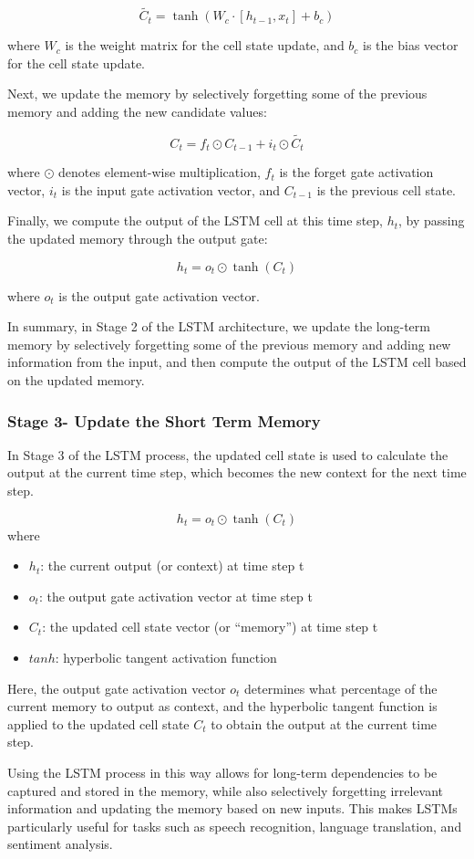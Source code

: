 \documentclass[
]{article}
\providecommand{\tightlist}{%
  \setlength{\itemsep}{0pt}\setlength{\parskip}{0pt}}
\begin{document}
\[\tilde{C_t} = \tanh(W_c \cdot [h_{t-1}, x_t] + b_c)\]

where \(W_c\) is the weight matrix for the cell state update, and
\(b_c\) is the bias vector for the cell state update.

Next, we update the memory by selectively forgetting some of the
previous memory and adding the new candidate values:

\[C_t = f_t \odot C_{t-1} + i_t \odot \tilde{C_t}\]

where \(\odot\) denotes element-wise multiplication, \(f_t\) is the
forget gate activation vector, \(i_t\) is the input gate activation
vector, and \(C_{t-1}\) is the previous cell state.

Finally, we compute the output of the LSTM cell at this time step,
\(h_t\), by passing the updated memory through the output gate:

\[h_t = o_t \odot \tanh(C_t)\]

where \(o_t\) is the output gate activation vector.

In summary, in Stage 2 of the LSTM architecture, we update the long-term
memory by selectively forgetting some of the previous memory and adding
new information from the input, and then compute the output of the LSTM
cell based on the updated memory.

\hypertarget{stage-3--update-the-short-term-memory}{%
\subsubsection{Stage 3- Update the Short Term
Memory}\label{stage-3--update-the-short-term-memory}}

In Stage 3 of the LSTM process, the updated cell state is used to
calculate the output at the current time step, which becomes the new
context for the next time step.

\[ h_t = o_t \odot \tanh(C_t) \] where

\begin{itemize}
\tightlist
\item
  \(h_t\): the current output (or context) at time step t
\item
  \(o_t\): the output gate activation vector at time step t
\item
  \(C_t\): the updated cell state vector (or ``memory'') at time step t
\item
  \(tanh\): hyperbolic tangent activation function
\end{itemize}

Here, the output gate activation vector \(o_t\) determines what
percentage of the current memory to output as context, and the
hyperbolic tangent function is applied to the updated cell state \(C_t\)
to obtain the output at the current time step.

Using the LSTM process in this way allows for long-term dependencies to
be captured and stored in the memory, while also selectively forgetting
irrelevant information and updating the memory based on new inputs. This
makes LSTMs particularly useful for tasks such as speech recognition,
language translation, and sentiment analysis.
\end{document}
